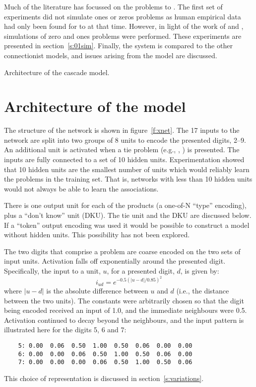 Much of the literature has focussed on the problems  to .  The
first set of experiments did not simulate ones or zeros problems as human
empirical data had only been found for  to  at that time.  However,
in light of the work of  and , simulations
of zero and ones problems were performed.  These experiments are presented
in section~\ref{s:01sim}. Finally, the system is compared to the other
connectionist models, and issues arising from the model are discussed.


\begin{fancyfigure}\centerline{%
}
\caption{Architecture of the cascade model.}
\label{f:xnet}
\end{fancyfigure}

\section{Architecture of the model}

The structure of the network is shown in figure~\ref{f:xnet}. The 17 inputs
to the network are split into two groups of 8 units to encode the presented
digits, 2--9. An additional unit is activated when a tie problem (e.g.,
, ) is presented.  The inputs are fully connected to a set of 10
hidden units.  Experimentation showed that 10 hidden units are the
smallest number of units which would reliably learn the problems
in the training set.  That is, networks with less than 10 hidden units would
not always be able to learn the associations.

There is one output unit for each of the products (a one-of-N
``type'' encoding), plus a ``don't
know'' unit (DKU). The tie unit and the DKU are discussed below.  If a
``token'' output encoding was used it would be possible to construct a
model
without hidden units.  This possibility has not been explored.


The two digits that comprise a problem are coarse encoded on the two sets
of input units. Activation falls off exponentially around the presented
digit.  Specifically, the
input to a unit, $u$, for a presented digit, $d$, is given by:
$$ i_{ud} = e^{-0.5(|u-d|/0.85)^2} $$
\noindent where $|u-d|$ is the absolute difference between
$u$ and $d$ (i.e., the distance between the two units).
The constants were arbitrarily chosen so that the digit being encoded
received an input of 1.0, and the
immediate neighbours were 0.5.  Activation continued to
decay beyond the neighbours,
and the input pattern is illustrated here for the digits 5, 6 and 7:
\begin{singlespace}
\begin{verbatim}
    5: 0.00  0.06  0.50  1.00  0.50  0.06  0.00  0.00
    6: 0.00  0.00  0.06  0.50  1.00  0.50  0.06  0.00
    7: 0.00  0.00  0.00  0.06  0.50  1.00  0.50  0.06
\end{verbatim}
\end{singlespace}
\noindent This
choice of representation is discussed in section~\ref{s:variations}.


